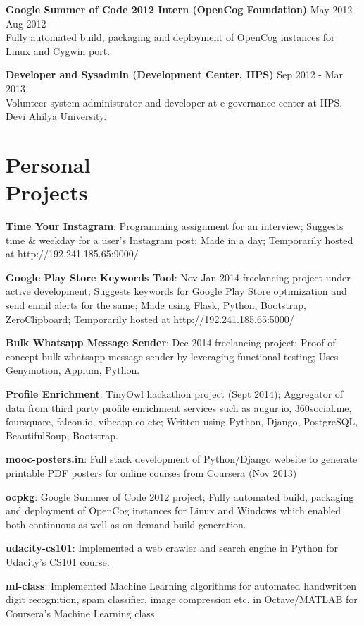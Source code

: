 \documentclass[margin,line]{resume}
\begin{document}
\begin{resume}
\begin{list2}
	\item \textbf{Google Summer of Code 2012 Intern (OpenCog Foundation)} \hspace{18mm} May 2012 - Aug 2012 \\ Fully automated build, packaging and deployment of OpenCog instances for Linux and Cygwin port.

	\item \textbf{Developer and Sysadmin (Development Center, IIPS)} \hspace{30mm} Sep 2012 - Mar 2013 \\ Volunteer system administrator and developer at e-governance center at IIPS, Devi Ahilya University.

	\end{list2}

    \section{\mysidestyle Personal \\ Projects} 
	\begin{list2}

	\item \textbf{Time Your Instagram}: Programming assignment for an interview; Suggests time \& weekday for a user's Instagram post; Made in a day; Temporarily hosted at http://192.241.185.65:9000/
	\item \textbf{Google Play Store Keywords Tool}: Nov-Jan 2014 freelancing project under active development; Suggests keywords for Google Play Store optimization and send email alerts for the same; Made using Flask, Python, Bootstrap, ZeroClipboard; Temporarily hosted at http://192.241.185.65:5000/
	\item \textbf{Bulk Whatsapp Message Sender}: Dec 2014 freelancing project; Proof-of-concept bulk whatsapp message sender by leveraging functional testing; Uses Genymotion, Appium, Python.
	\item \textbf{Profile Enrichment}: TinyOwl hackathon project (Sept 2014); Aggregator of data from third party profile enrichment services such as augur.io, 360social.me, foursquare, falcon.io, vibeapp.co etc; Written using Python, Django, PostgreSQL, BeautifulSoup, Bootstrap.
	\item \textbf{mooc-posters.in}: Full stack development of Python/Django website to generate printable PDF posters for online courses from Coursera (Nov 2013)
	\item \textbf{ocpkg}: Google Summer of Code 2012 project; Fully automated build, packaging and deployment of OpenCog instances for Linux and Windows which enabled both continuous as well as on-demand build generation.
	\item \textbf{udacity-cs101}: Implemented a web crawler and search engine in Python for Udacity's CS101 course.
	\item \textbf{ml-class}: Implemented Machine Learning algorithms for automated handwritten digit recognition, spam classifier, image compression etc. in Octave/MATLAB for Coursera's Machine Learning class.
    \end{list2}


\end{resume}
\end{document}
